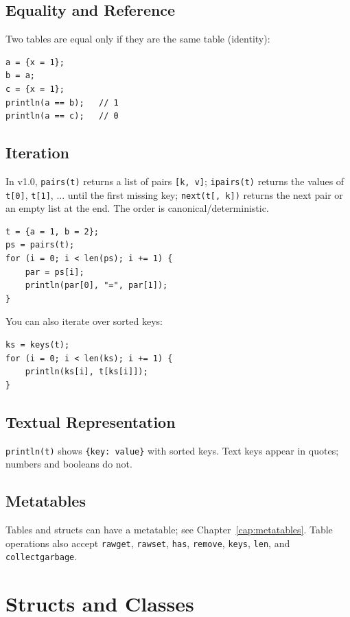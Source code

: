 \documentclass[11pt,a4paper,oneside]{report}
\newcommand{\code}[1]{\texttt{#1}}
\begin{document}
\section{Equality and Reference}
Two tables are equal only if they are the same table (identity):
\begin{lstlisting}
a = {x = 1};
b = a;
c = {x = 1};
println(a == b);   // 1
println(a == c);   // 0
\end{lstlisting}

\section{Iteration}
In v1.0, \code{pairs(t)} returns a list of pairs \code{[k, v]};
\code{ipairs(t)} returns the values of \code{t[0]}, \code{t[1]}, ...
until the first missing key; \code{next(t[, k])} returns the next pair or
an empty list at the end. The order is canonical/deterministic.

\begin{lstlisting}
t = {a = 1, b = 2};
ps = pairs(t);
for (i = 0; i < len(ps); i += 1) {
    par = ps[i];
    println(par[0], "=", par[1]);
}
\end{lstlisting}

You can also iterate over sorted keys:
\begin{lstlisting}
ks = keys(t);
for (i = 0; i < len(ks); i += 1) {
    println(ks[i], t[ks[i]]);
}
\end{lstlisting}

\section{Textual Representation}
\code{println(t)} shows \code{\{key: value\}} with sorted keys. Text keys
appear in quotes; numbers and booleans do not.

\section{Metatables}
Tables and structs can have a metatable; see
Chapter~\ref{cap:metatables}. Table operations also accept
\code{rawget}, \code{rawset}, \code{has}, \code{remove}, \code{keys},
\code{len}, and \code{collectgarbage}.

\chapter{Structs and Classes}
\label{cap:structs}
\end{document}
